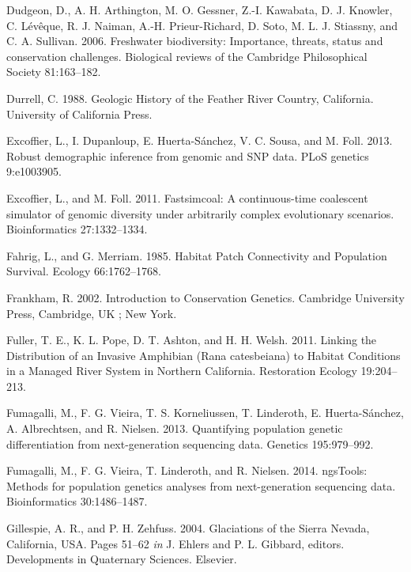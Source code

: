 \documentclass[proquest,12pt,final]{ucthesis-CA2012} %
\begin{document}
\begin{ucmainmatter}
\leavevmode\hypertarget{ref-dudgeon_freshwater_2006}{}%
Dudgeon, D., A. H. Arthington, M. O. Gessner, Z.-I. Kawabata, D. J.
Knowler, C. Lévêque, R. J. Naiman, A.-H. Prieur-Richard, D. Soto, M. L.
J. Stiassny, and C. A. Sullivan. 2006. Freshwater biodiversity:
Importance, threats, status and conservation challenges. Biological
reviews of the Cambridge Philosophical Society 81:163--182.

\leavevmode\hypertarget{ref-durrell_geologic_1988}{}%
Durrell, C. 1988. Geologic History of the Feather River Country,
California. University of California Press.

\leavevmode\hypertarget{ref-excoffier_robust_2013}{}%
Excoffier, L., I. Dupanloup, E. Huerta-Sánchez, V. C. Sousa, and M.
Foll. 2013. Robust demographic inference from genomic and SNP data. PLoS
genetics 9:e1003905.

\leavevmode\hypertarget{ref-excoffier_fastsimcoal_2011}{}%
Excoffier, L., and M. Foll. 2011. Fastsimcoal: A continuous-time
coalescent simulator of genomic diversity under arbitrarily complex
evolutionary scenarios. Bioinformatics 27:1332--1334.

\leavevmode\hypertarget{ref-fahrig_habitat_1985}{}%
Fahrig, L., and G. Merriam. 1985. Habitat Patch Connectivity and
Population Survival. Ecology 66:1762--1768.

\leavevmode\hypertarget{ref-frankham_introduction_2002}{}%
Frankham, R. 2002. Introduction to Conservation Genetics. Cambridge
University Press, Cambridge, UK ; New York.

\leavevmode\hypertarget{ref-fuller_linking_2011}{}%
Fuller, T. E., K. L. Pope, D. T. Ashton, and H. H. Welsh. 2011. Linking
the Distribution of an Invasive Amphibian (Rana catesbeiana) to Habitat
Conditions in a Managed River System in Northern California. Restoration
Ecology 19:204--213.

\leavevmode\hypertarget{ref-fumagalli_quantifying_2013}{}%
Fumagalli, M., F. G. Vieira, T. S. Korneliussen, T. Linderoth, E.
Huerta-Sánchez, A. Albrechtsen, and R. Nielsen. 2013. Quantifying
population genetic differentiation from next-generation sequencing data.
Genetics 195:979--992.

\leavevmode\hypertarget{ref-fumagalli_ngstools_2014}{}%
Fumagalli, M., F. G. Vieira, T. Linderoth, and R. Nielsen. 2014.
ngsTools: Methods for population genetics analyses from next-generation
sequencing data. Bioinformatics 30:1486--1487.

\leavevmode\hypertarget{ref-gillespie_glaciations_2004}{}%
Gillespie, A. R., and P. H. Zehfuss. 2004. Glaciations of the Sierra
Nevada, California, USA. Pages 51--62 \emph{in} J. Ehlers and P. L.
Gibbard, editors. Developments in Quaternary Sciences. Elsevier.


\end{ucmainmatter}
\end{document}
